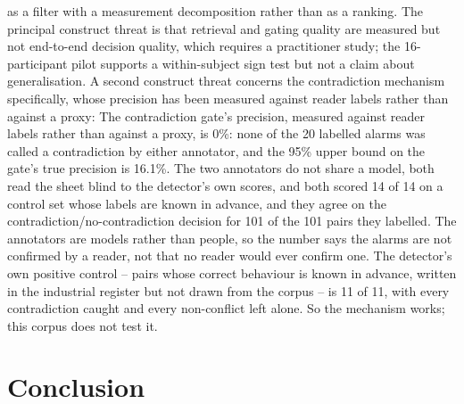 \documentclass[preprint,3p,times]{elsarticle}
\begin{document}
as a filter with a measurement decomposition rather than as a ranking. The
principal construct threat is that retrieval and gating quality are measured
but not end-to-end decision quality, which requires a practitioner study; the
16-participant pilot supports a within-subject sign test but not a claim about
generalisation. A second construct threat concerns the contradiction
mechanism specifically, whose precision has been measured against reader
labels rather than against a proxy: The contradiction gate's precision, measured against reader labels rather than against a proxy, is 0\%: none of the 20 labelled alarms was called a contradiction by either annotator, and the 95\% upper bound on the gate's true precision is 16.1\%. The two annotators do not share a model, both read the sheet blind to the detector's own scores, and both scored 14 of 14 on a control set whose labels are known in advance, and they agree on the contradiction/no-contradiction decision for 101 of the 101 pairs they labelled. The annotators are models rather than people, so the number says the alarms are not confirmed by a reader, not that no reader would ever confirm one.
 The detector's own positive control -- pairs whose correct behaviour is known in advance, written in the industrial register but not drawn from the corpus -- is 11 of 11, with every contradiction caught and every non-conflict left alone. So the mechanism works; this corpus does not test it.

\section{Conclusion}
\end{document}
